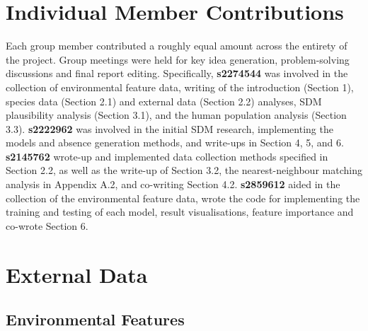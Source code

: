 \documentclass{article}
\begin{document}
\section*{Individual Member Contributions}
Each group member contributed a roughly equal amount across the entirety of the project. Group meetings were held for key idea generation, problem-solving discussions and final report editing.
Specifically, \textbf{s2274544} was involved in the collection of environmental feature data, writing of the introduction (Section 1), species data (Section 2.1) and external data (Section 2.2) analyses, SDM plausibility analysis (Section 3.1), and the human population analysis (Section 3.3).
\textbf{s2222962} was involved in the initial SDM research, implementing the models and absence generation methods, and write-ups in Section 4, 5, and 6.
\textbf{s2145762} wrote-up and implemented data collection methods specified in Section 2.2, as well as the write-up of Section 3.2, the nearest-neighbour matching analysis in Appendix A.2, and co-writing Section 4.2.
\textbf{s2859612} aided in the collection of the environmental feature data, wrote the code for implementing the training and testing of each model, result visualisations, feature importance and co-wrote Section 6. 

\newpage







\newpage
\appendix

\section{External Data}
\subsection{Environmental Features}
\label{app:environmental features}
\end{document}
